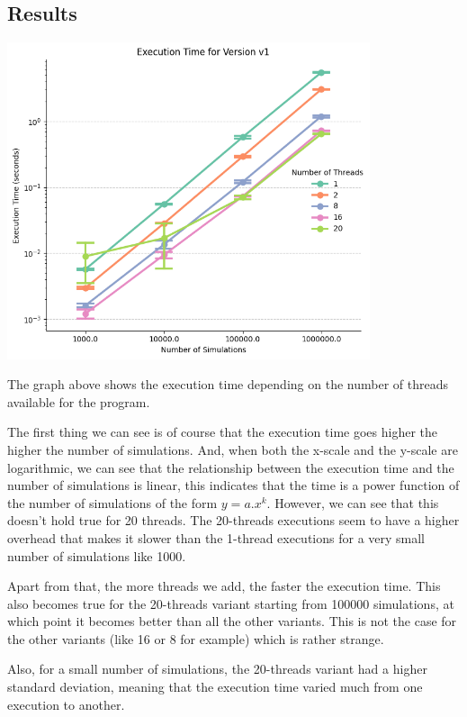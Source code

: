 \documentclass[12pt,a4paper]{report}
\begin{document}
\subsection{Results}

\begin{center}
\includegraphics[width=0.8\textwidth]{cpu_exec.png}\par
\end{center}

The graph above shows the execution time depending on the number of threads available for the program.

The first thing we can see is of course that the execution time goes higher the higher the number of simulations. And, when both the x-scale and the y-scale are logarithmic, we can see that the relationship between the execution time and the number of simulations is linear, this indicates that the time is a power function of the number of simulations of the form $y=a.x^k$. However, we can see that this doesn't hold true for 20 threads.
The 20-threads executions seem to have a higher overhead that makes it slower than the 1-thread executions for a very small number of simulations like 1000.

Apart from that, the more threads we add, the faster the execution time. This also becomes true for the 20-threads variant starting from 100000 simulations, at which point it becomes better than all the other variants. This is not the case for the other variants (like 16 or 8 for example) which is rather strange.

Also, for a small number of simulations, the 20-threads variant had a higher standard deviation, meaning that the execution time varied much from one execution to another.
\end{document}
